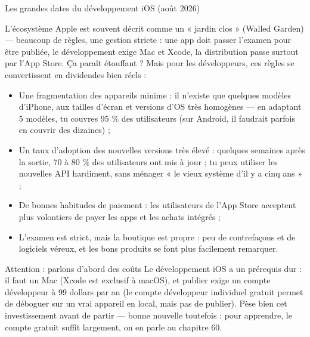 \begin{center}\small\color{gray}Les grandes dates du développement iOS (août 2026)\end{center}


L’écosystème Apple est souvent décrit comme un « jardin clos » (Walled Garden) — beaucoup de règles, une gestion stricte : une app doit passer l’examen pour être publiée, le développement exige Mac et Xcode, la distribution passe surtout par l’App Store. Ça paraît étouffant ? Mais pour les développeurs, ces règles se convertissent en dividendes bien réels :

\begin{itemize}
  \item Une fragmentation des appareils minime : il n’existe que quelques modèles d’iPhone, aux tailles d’écran et versions d’OS très homogènes — en adaptant 5 modèles, tu couvres 95 \% des utilisateurs (sur Android, il faudrait parfois en couvrir des dizaines) ;
  \item Un taux d’adoption des nouvelles versions très élevé : quelques semaines après la sortie, 70 à 80 \% des utilisateurs ont mis à jour ; tu peux utiliser les nouvelles API hardiment, sans ménager « le vieux système d’il y a cinq ans » ;
  \item De bonnes habitudes de paiement : les utilisateurs de l’App Store acceptent plus volontiers de payer les apps et les achats intégrés ;
  \item L’examen est strict, mais la boutique est propre : peu de contrefaçons et de logiciels véreux, et les bons produits se font plus facilement remarquer.
\end{itemize}

\begin{tcbwarn}{Attention : parlons d’abord des coûts}
Le développement iOS a un prérequis dur : il faut un Mac (Xcode est exclusif à macOS), et publier exige un compte développeur à 99 dollars par an (le compte développeur individuel gratuit permet de déboguer sur un vrai appareil en local, mais pas de publier). Pèse bien cet investissement avant de partir — bonne nouvelle toutefois : pour apprendre, le compte gratuit suffit largement, on en parle au chapitre 60.

\end{tcbwarn}


